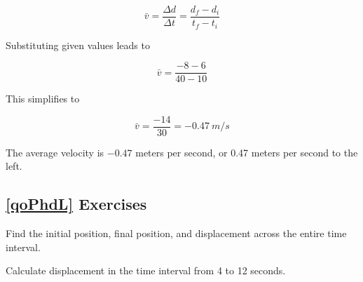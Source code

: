 \documentclass[main.tex]{subfiles}
\begin{document}
\begin{equation*}
    \bar{v} = \frac{\Delta{d}}{\Delta{t}} = \frac{d_f - d_i}{t_f - t_i}
\end{equation*}

Substituting given values leads to

\begin{equation*}
    \bar{v} = \frac{-8-6}{40-10}
\end{equation*}

This simplifies to

\begin{equation*}
    \bar{v} = \frac{-14}{30} = -\SI{0.47}{m/s}
\end{equation*}

The average velocity is $-0.47$ meters per second, or 0.47 meters per second to the left.


\vspace{1em}

\cyanhrule

\subsection*{\ref{qoPhdL} Exercises}



\begin{center}
\end{center}

\begin{exercise} \label{WTBtZb}
    Find the initial position, final position, and displacement across the entire time interval.
\end{exercise}

\begin{exercise} \label{wqqrdf}
    Calculate displacement in the time interval from 4 to 12 seconds.
\end{exercise}
\end{document}

